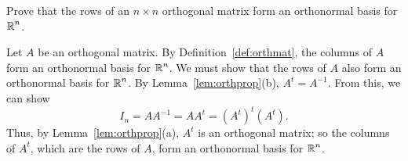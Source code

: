 \documentclass{ximera}
\begin{document}
\begin{exercise}  \label{c7.9.45}
Prove that the rows of an $n\times n$ orthogonal matrix form an orthonormal
basis for $\mbox{$\Bbb{R}$}^n$.

\begin{solution}

\soln Let $A$ be an orthogonal matrix.  By
Definition~\ref{def:orthmat}, the columns of $A$ form an orthonormal
basis for $\mbox{$\Bbb{R}$}^n$.  We must show that the rows of $A$ also form an
orthonormal basis for $\mbox{$\Bbb{R}$}^n$.  By Lemma~\ref{lem:orthprop}(b), $A^t =
A^{-1}$.  From this, we can show
\[
I_n = AA^{-1} = AA^t = (A^t)^t(A^t).
\]
Thus, by Lemma~\ref{lem:orthprop}(a), $A^t$ is an orthogonal matrix;
so the columns of $A^t$, which are the rows of $A$, form an orthonormal
basis for $\mbox{$\Bbb{R}$}^n$.

\end{solution}
\end{exercise}
\end{document}
